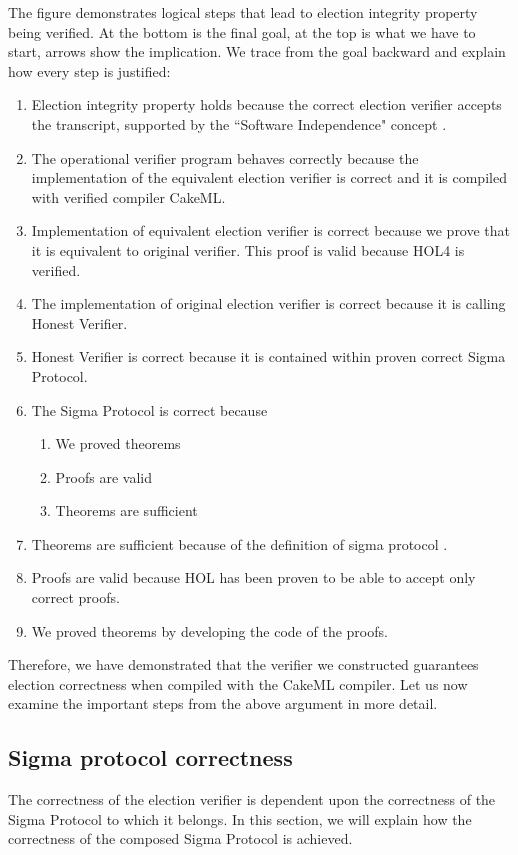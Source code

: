     The figure demonstrates logical steps that lead to election integrity property being verified. At the bottom is the final goal, at the top is what we have to start, arrows show the implication. We trace from the goal backward and explain how every step is justified:
\begin{enumerate}
    \item Election integrity property holds because the correct election verifier accepts the transcript, supported by the ``Software Independence" concept \cite{Rivest2008OnTN}.
  \item The operational verifier program behaves correctly because the implementation of the equivalent election verifier is correct and it is compiled with verified compiler CakeML.
  \item Implementation of equivalent election verifier is correct because we prove that it is equivalent to original verifier. This proof is valid because HOL4 is verified. 
  \item The implementation of original election verifier is correct because it is calling Honest Verifier.
  \item Honest Verifier is correct because it is contained within proven correct Sigma Protocol.
  \item The Sigma Protocol is correct because
  \begin{enumerate}
      \item We proved theorems
      \item Proofs are valid
      \item Theorems are sufficient
  \end{enumerate}
  \item Theorems are sufficient because of the definition of sigma protocol \cite{damgaard2010sigma}.
  \item Proofs are valid because HOL has been proven to be able to accept only correct proofs.
  \item We proved theorems by developing the code of the proofs.
\end{enumerate}


Therefore, we have demonstrated that the verifier we constructed guarantees election correctness when compiled with the CakeML compiler. Let us now examine the important steps from the above argument in more detail.

\subsection{Sigma protocol correctness}
The correctness of the election verifier is dependent upon the correctness of the Sigma Protocol to which it belongs. In this section, we will explain how the correctness of the composed Sigma Protocol is achieved.

